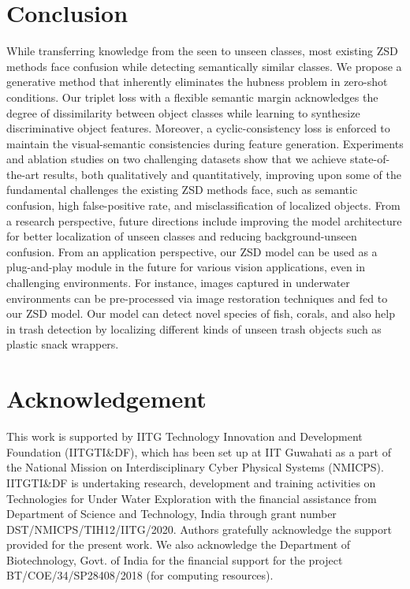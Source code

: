 \documentclass{bmvc2k}
\begin{document}
\section{Conclusion}
While transferring knowledge from the seen to unseen classes, most existing ZSD methods face confusion while detecting semantically similar classes. We propose a generative method that inherently eliminates the hubness problem in zero-shot conditions. Our triplet loss with a flexible semantic margin acknowledges the degree of dissimilarity between object classes while learning to synthesize discriminative object features. Moreover, a cyclic-consistency loss is enforced to maintain the visual-semantic consistencies during feature generation. Experiments and ablation studies on two challenging datasets show that we achieve state-of-the-art results, both qualitatively and quantitatively, improving upon some of the fundamental challenges the existing ZSD methods face, such as semantic confusion, high false-positive rate, and misclassification of localized objects. From a research perspective, future directions include improving the model architecture for better localization of unseen classes and reducing background-unseen confusion. From an application perspective, our ZSD model can be used as a plug-and-play module in the future for various vision applications, even in challenging environments. For instance, images captured in underwater environments can be pre-processed via image restoration techniques and fed to our ZSD model. Our model can detect novel species of fish, corals, and also help in trash detection by localizing different kinds of unseen trash objects such as plastic snack wrappers. 

\section{Acknowledgement}
This work is supported by IITG Technology Innovation and Development Foundation (IITGTI\&DF), which has been set up at IIT Guwahati as a part of the National Mission on Interdisciplinary Cyber Physical Systems (NMICPS). IITGTI\&DF is undertaking research, development and training activities on Technologies for Under Water Exploration with the financial assistance from Department of Science and Technology, India through grant number DST/NMICPS/TIH12/IITG/2020. Authors gratefully acknowledge the support provided for the present work. We also acknowledge the Department of Biotechnology, Govt. of India for the financial support for the project BT/COE/34/SP28408/2018 (for computing resources).


\end{document}
